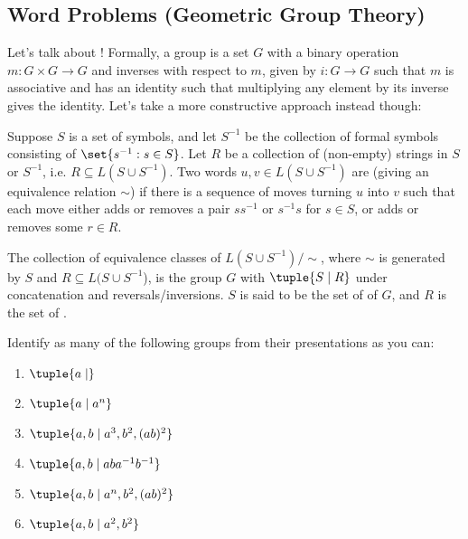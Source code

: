 \documentclass[12pt]{article}
\begin{document}
\subsection{Word Problems (Geometric Group Theory)}
Let's talk about ! Formally, a group is a set $G$ with a binary
operation $m : G \times G \to G$ and inverses with respect to $m$, given by $i :
G \to G$ such that $m$ is associative and has an identity such that multiplying
any element by its inverse gives the identity. Let's take a more constructive
approach instead though: 

\begin{definition*}
  Suppose $S$ is a set of symbols, and let $S^{-1}$ be the collection of formal
  symbols consisting of $\set{s^{-1} : s \in S}$. Let $R$ be a collection of
  (non-empty) strings in $S$ or $S^{-1}$, i.e. $R \subseteq L(S \cup S^{-1})$.
  Two words $u, v \in L(S \cup S^{-1})$ are  (giving an
  equivalence relation $\sim$) if there is a
  sequence of moves turning $u$ into $v$ such that each move either adds or
  removes a pair $s s^{-1}$ or $s^{-1} s$ for $s \in S$, or adds or removes
  some $r \in R$. 
\end{definition*}
\begin{definition*}
  The collection of equivalence classes of $L(S \cup S^{-1}) /
  \sim$, where $\sim$ is generated by $S$ and $R \subseteq L(S \cup S^{-1}$), is the group $G$ with  $\tuple{S \mid R}$ under
  concatenation and reversals/inversions. $S$ is said to be the set of
   of $G$, and $R$ is the set of .  
\end{definition*}
\begin{exercise}
  Identify as many of the following groups from their presentations as you can: 
\begin{center}
  \begin{multicols}{3}
    \begin{enumerate}[label=(\alph*)]
    \item $\tuple{a \mid }$ 
    \item $\tuple{a \mid a^n}$ 
    \item $\tuple{a, b \mid a^3, b^2, (ab)^2 }$
    \item $\tuple{a, b \mid aba^{-1}b^{-1}}$ 
    \item $\tuple{a, b \mid a^n, b^2, (ab)^2 }$
    \item $\tuple{a, b \mid a^2, b^2}$
  \end{enumerate}
  \end{multicols}
\end{center}
\end{exercise}
\end{document}
